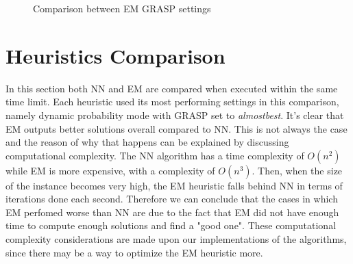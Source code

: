 \begin{figure}[htbp]
	\centering
	\caption{Comparison between EM GRASP settings}
    \label{fig:emCmp}
\end{figure}

\section{Heuristics Comparison}

In this section both NN and EM are compared when executed within the same time limit.
Each heuristic used its most performing settings in this comparison, namely dynamic probability mode with GRASP set to \textit{almostbest}.
It's clear that EM outputs better solutions overall compared to NN.
This is not always the case and the reason of why that happens can be explained by discussing computational complexity.
The NN algorithm has a time complexity of $O(n^2)$ while EM is more expensive, with a complexity of $O(n^3)$.
Then, when the size of the instance becomes very high, the EM heuristic falls behind NN in terms of iterations done each second.
Therefore we can conclude that the cases in which EM perfomed worse than NN are due to the fact that EM did not have enough time to compute enough solutions and find a "good one".
These computational complexity considerations are made upon our implementations of the algorithms, since there may be a way to optimize the EM heuristic more.

